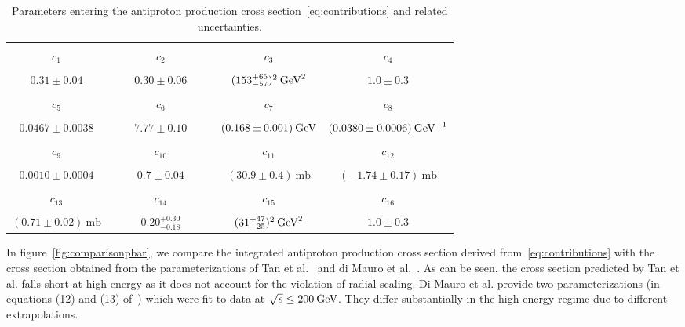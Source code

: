 \documentclass[a4paper,11pt]{article}
\newcommand{\eVdist}{\kern-0.06em}
\newcommand{\gev}{\:\text{Ge\eVdist V}}
\newcommand{\mb}{\:\text{mb}}
\begin{document}
\begin{table}[htp]
\begin{center}
\begin{tabular}{|cccc|}
\hline
\rowcolor{light-gray}  &   &  &    \\[-4mm]
\rowcolor{light-gray}  $c_1$ & $\qquad\qquad c_2\qquad\qquad$ & $\qquad\qquad c_3\qquad\qquad$ & $c_4$  \\[1mm]
\hline 
 &   &  &    \\[-3mm]
  $0.31\pm 0.04$ & $0.30\pm 0.06$ & $(153^{+65}_{-57})^2\gev^2$ & $1.0\pm 0.3$\\[1mm]
\hline  
\rowcolor{light-gray}  &   &  &    \\[-4mm]
\rowcolor{light-gray}  $c_5$ & $c_6$ & $c_7$ & $c_8$  \\[1mm]
\hline
 &   &  &    \\[-3mm]  
   $0.0467\pm 0.0038$ & $7.77\pm 0.10$ & $(0.168\pm 0.001)\gev$ & $(0.0380\pm 0.0006)\gev^{-1}$  \\[1mm]
 \hline
 \rowcolor{light-gray}  &   &  &    \\[-4mm]
\rowcolor{light-gray}  $c_9$ & $c_{10}$ & $c_{11}$ & $c_{12}$  \\[1mm]
\hline 
 &   &  &    \\[-3mm]
  $0.0010\pm 0.0004$ & $0.7\pm 0.04$ & $(30.9\pm 0.4)\mb$ & $(-1.74\pm 0.17)\mb$\\[1mm]
\hline  
\rowcolor{light-gray}  &   &  &    \\[-4mm]
\rowcolor{light-gray}  $c_{13}$ & $c_{14}$ & $c_{15}$ & $c_{16}$  \\[1mm]
\hline
 &   &  &    \\[-3mm]  
   $(0.71\pm 0.02)\mb$ & $0.20^{+0.30}_{-0.18}$ & $(31^{+47}_{-25})^2\gev^2$ & $1.0\pm 0.3$  \\[1mm]
   \hline
\end{tabular}
\end{center}
\caption{Parameters entering the antiproton production cross section~\eqref{eq:contributions} and related uncertainties.}
\label{tab:pbarcross}
\end{table}
In figure~\ref{fig:comparisonpbar}, we compare the integrated antiproton production cross section derived from~\eqref{eq:contributions} with the cross section obtained from the parameterizations of Tan et al.~\cite{Tan:1982nc} and di Mauro et al.~\cite{diMauro:2014zea}. As can be seen, the cross section predicted by Tan et al. falls short at high energy as it does not account for the violation of radial scaling. Di Mauro et al. provide two parameterizations (in equations (12) and (13) of~\cite{diMauro:2014zea}) which were fit to data at $\sqrt{s}\leq 200\gev$. They differ substantially in the high energy regime due to different extrapolations.
\end{document}
